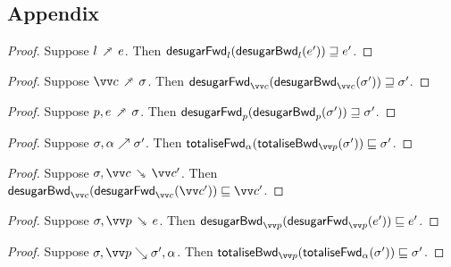 \subsection{Appendix}
\begin{proof}
  Suppose $l \dfwdarrow e$. Then $\mathsf{desugarFwd}_{l}(\mathsf{desugarBwd}_{l}(e')) \sqsupseteq e'$.
\end{proof}
\begin{proof}
  Suppose $\vec{c} \dfwdarrow \sigma$. Then $\desugarFwdF{\vec{c}}(\desugarBwdF{\vec{c}}(\sigma')) \geq \sigma'$.
\end{proof}
\begin{proof}
  Suppose $p, e \dfwdarrow \sigma$. Then $\mathsf{desugarFwd}_{p}(\mathsf{desugarBwd}_{p}(\sigma')) \sqsupseteq \sigma'$.
\end{proof}
\begin{proof}
  Suppose ${\sigma},{\alpha} \nearrow {\sigma'}$. Then $\totaliseFwdF{\alpha}(\totaliseBwdF{\vec{p}}(\sigma')) \leq \sigma'$.
\end{proof}
\begin{proof}
  Suppose $\sigma, \vec{c} \dbwdarrow \vec{c}'$. Then $\desugarBwdF{\vec{c}}(\desugarFwdF{\vec{c}}(\vec{c}')) \leq \vec{c}'$.
\end{proof}
\begin{proof}
  Suppose $\sigma, \vec{p} \dbwdarrow e$. Then $\desugarBwdF{\vec{p}}(\desugarFwdF{\vec{p}}(e')) \leq e'$.
\end{proof}
\begin{proof}
  Suppose $\totalisebwd{\sigma}{\vec{p}}{\sigma'}{\alpha}$. Then $\totaliseBwdF{\vec{p}}(\totaliseFwdF{\alpha}(\sigma')) \leq \sigma'$.
\end{proof}